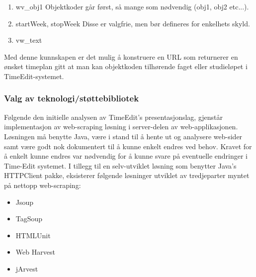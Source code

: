 \documentclass[../main.tex]{subfiles}
\begin{document}
\begin{enumerate}
\item wv\_obj1
Objektkoder går først, så mange som nødvendig (obj1, obj2 etc...).
\item startWeek, stopWeek
Disse er valgfrie, men bør defineres for enkelhets skyld.
\item vw\_text
\end{enumerate}

Med denne kunnskapen er det mulig å konstruere en URL som returnerer en ønsket timeplan gitt at man kan objektkoden tilhørende faget eller studieløpet i TimeEdit-systemet. 

\subsubsection{Valg av teknologi/støttebibliotek}

Følgende den initielle analysen av TimeEdit’s presentasjonslag, gjenstår implementasjon av web-scraping løsning i server-delen av web-applikasjonen.  Løsningen må benytte Java, være i stand til å hente ut og analysere web-sider samt være godt nok dokumentert til å kunne enkelt endres ved behov. Kravet for å enkelt kunne endres var nødvendig for å kunne svare på eventuelle endringer i Time-Edit systemet.
I tillegg til en selv-utviklet løsning som benytter Java's HTTPClient pakke, eksisterer følgende løsninger utviklet av tredjeparter myntet på nettopp web-scraping:

\begin{itemize}
\item Jsoup 
\item TagSoup 
\item HTMLUnit 
\item Web Harvest 
\item jArvest 
\end{itemize}
\end{document}

